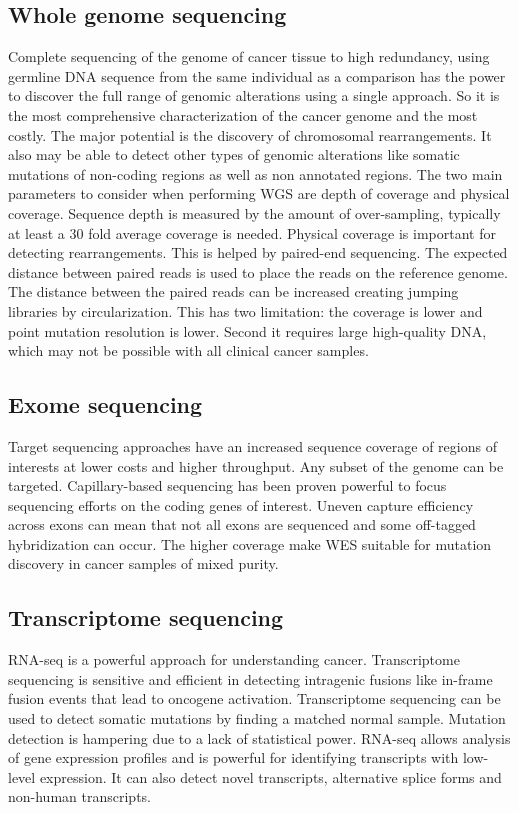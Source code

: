 	\subsection{Whole genome sequencing}
	Complete sequencing of the genome of cancer tissue to high redundancy, using germline DNA sequence from the same individual as a comparison has the power to discover the full range of genomic alterations using a single approach.
	So it is the most comprehensive characterization of the cancer genome and the most costly.
	The major potential is the discovery of chromosomal rearrangements.
	It also may be able to detect other types of genomic alterations like somatic mutations of non-coding regions as well as non annotated regions.
	The two main parameters to consider when performing WGS are depth of coverage and physical coverage.
	Sequence depth is measured by the amount of over-sampling, typically at least a $30$ fold average coverage is needed.
	Physical coverage is important for detecting rearrangements.
	This is helped by paired-end sequencing.
	The expected distance between paired reads is used to place the reads on the reference genome.
	The distance between the paired reads can be increased creating jumping libraries by circularization.
	This has two limitation: the coverage is lower and point mutation resolution is lower.
	Second it requires large high-quality DNA, which may not be possible with all clinical cancer samples.

	\subsection{Exome sequencing}
	Target sequencing approaches have an increased sequence coverage of regions of interests at lower costs and higher throughput.
	Any subset of the genome can be targeted.
	Capillary-based sequencing has been proven powerful to focus sequencing efforts on the coding genes of interest.
	Uneven capture efficiency across exons can mean that not all exons are sequenced and some off-tagged hybridization can occur.
	The higher coverage make WES suitable for mutation discovery in cancer samples of mixed purity.

	\subsection{Transcriptome sequencing}
	RNA-seq is a powerful approach for understanding cancer.
	Transcriptome sequencing is sensitive and efficient in detecting intragenic fusions like in-frame fusion events that lead to oncogene activation.
	Transcriptome sequencing can be used to detect somatic mutations by finding a matched normal sample.
	Mutation detection is hampering due to a lack of statistical power.
	RNA-seq allows analysis of gene expression profiles and is powerful for identifying transcripts with low-level expression.
	It can also detect novel transcripts, alternative splice forms and non-human transcripts.

